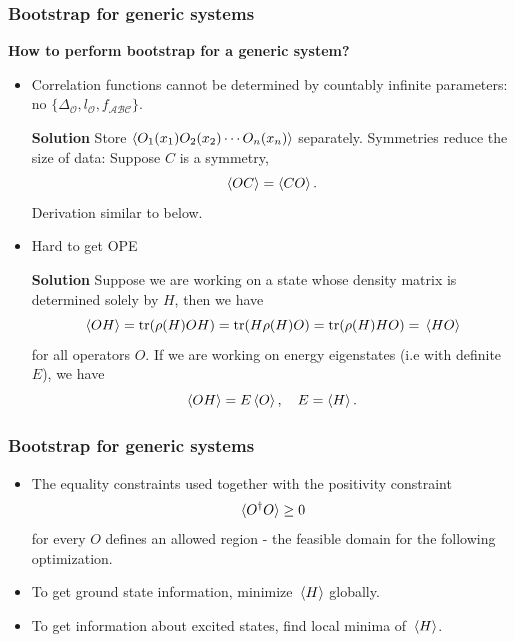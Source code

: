 \documentclass{beamer}
\begin{document}
\begin{frame}
\frametitle{Bootstrap for generic systems}

\textbf{How to perform bootstrap for a generic system?}    

\begin{itemize}
    \item Correlation functions cannot be determined by countably infinite parameters: 
    no $\{\Delta_{\mathcal{O}}, l_{\mathcal{O}}, f_{\mathcal{A} \mathcal{B} \mathcal{C}}\}$.
    
    \textbf{Solution} Store $\expval{O_1(x_1) O_2(x_2) \cdots O_n (x_n)}$ separately. Symmetries reduce the size 
    of data: Suppose $C$ is a symmetry, 
    \begin{equation}
        \expval{OC} = \expval{CO}.
    \end{equation}
    Derivation similar to below.
    
    \item Hard to get OPE
    
    \textbf{Solution} Suppose we are working on a state whose density matrix is determined solely by $H$,
    then we have 
    \begin{equation}
        \expval*{O H} = \trace (\rho(H) O H) = \trace(H \rho(H) O) = \trace(\rho(H) H O)  = \expval*{H {O}}
    \end{equation}
    for all operators $O$. If we are working on energy eigenstates (i.e with definite $E$), we have 
    \begin{equation}
        \expval{O H} = E \expval{O}, \quad E = \expval{H}.
    \end{equation}
\end{itemize}

\end{frame}

\begin{frame}
\frametitle{Bootstrap for generic systems}

\begin{itemize}
    \item The equality constraints used together with the positivity constraint 
    \begin{equation}
        \expval*{O^\dagger O} \geq 0
    \end{equation}
    for every $O$ defines an allowed region - the feasible domain for the following optimization.
    \item To get ground state information, minimize $\expval*{H}$ globally.
    \item To get information about excited states, find local minima of $\expval*{H}$.
\end{itemize} 

\begin{center}
    
\end{center}

\end{frame}
\end{document}
